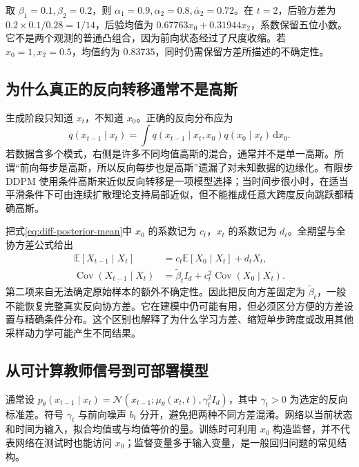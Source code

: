 \documentclass[UTF8,12pt,a4paper,fontset=fandol]{ctexart}
\begin{document}
\begin{example}[两步扩散的数值核对]
取 $\beta_1=0.1,\beta_2=0.2$，则 $\alpha_1=0.9,\alpha_2=0.8,\bar\alpha_2=0.72$。在 $t=2$，后验方差为 $0.2\times0.1/0.28=1/14$，后验均值为 $0.67763x_0+0.31944x_2$，系数保留五位小数。它不是两个观测的普通凸组合，因为前向状态经过了尺度收缩。若 $x_0=1,x_2=0.5$，均值约为 $0.83735$，同时仍需保留方差所描述的不确定性。
\end{example}

\subsection{为什么真正的反向转移通常不是高斯}
生成阶段只知道 $x_t$，不知道 $x_0$。正确的反向分布应为
\begin{equation}
 q(x_{t-1}\mid x_t)=\int q(x_{t-1}\mid x_t,x_0)q(x_0\mid x_t)\,\mathrm dx_0.
 \label{eq:diff-reverse-mixture}
\end{equation}
若数据含多个模式，右侧是许多不同均值高斯的混合，通常并不是单一高斯。所谓“前向每步是高斯，所以反向每步也是高斯”遗漏了对未知数据的边缘化。有限步 DDPM 使用条件高斯来近似反向转移是一项模型选择；当时间步很小时，在适当平滑条件下可由连续扩散理论支持局部近似，但不能推成任意大跨度反向跳跃都精确高斯。

把式\eqref{eq:diff-posterior-mean}中 $x_0$ 的系数记为 $c_t$，$x_t$ 的系数记为 $d_t$。全期望与全协方差公式给出
\begin{align}
 \mathbb E[X_{t-1}\mid X_t]&=c_t\mathbb E[X_0\mid X_t]+d_tX_t,\label{eq:diff-reverse-mean}\\
 \operatorname{Cov}(X_{t-1}\mid X_t)&=\widetilde\beta_t I_d+c_t^2\operatorname{Cov}(X_0\mid X_t).
 \label{eq:diff-reverse-var}
\end{align}
第二项来自无法确定原始样本的额外不确定性。因此把反向方差固定为 $\widetilde\beta_t$，一般不能恢复完整真实反向协方差。它在建模中仍可能有用，但必须区分方便的方差设置与精确条件分布。这个区别也解释了为什么学习方差、缩短单步跨度或改用其他采样动力学可能产生不同结果。

\subsection{从可计算教师信号到可部署模型}
通常设 $p_\theta(x_{t-1}\mid x_t)=\mathcal N(x_{t-1};\mu_\theta(x_t,t),\gamma_t^2I_d)$，其中 $\gamma_t>0$ 为选定的反向标准差。符号 $\gamma_t$ 与前向噪声 $b_t$ 分开，避免把两种不同方差混淆。网络以当前状态和时间为输入，拟合均值或与均值等价的量。训练时可利用 $x_0$ 构造监督，并不代表网络在测试时也能访问 $x_0$；监督变量多于输入变量，是一般回归问题的常见结构。
\end{document}
